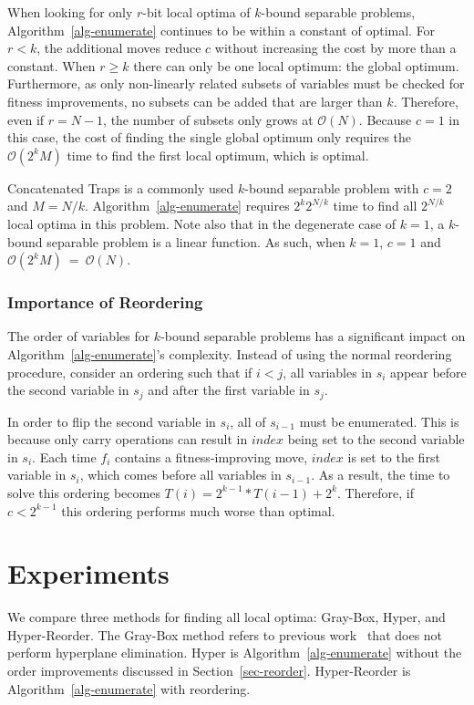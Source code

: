 \documentclass[runningheads,a4paper]{llncs}
\newcommand{\BigO}[1]{$\mathcal{O}{(#1)}$}
\begin{document}
When looking for only $r$-bit local optima of $k$-bound separable problems,
Algorithm~\ref{alg-enumerate} continues to be within a constant of optimal.
For $r < k$, the additional moves reduce $c$ without increasing the cost
by more than a constant.
When $r \geq k$ there can only be one local optimum: the global optimum. Furthermore, as
only non-linearly related subsets of variables must be checked
for fitness improvements, no subsets can be added that are larger than $k$.
Therefore, even if $r=N-1$, the number of subsets only grows at \BigO{N}.
Because $c=1$ in this case, the cost of finding the single global optimum
only requires the \BigO{2^kM} time to find the first local optimum, which is
optimal.

Concatenated Traps is a commonly used $k$-bound separable problem
with $c=2$ and $M=N/k$.  Algorithm~\ref{alg-enumerate} requires $2^k2^{N/k}$ time
to find all $2^{N/k}$ local optima in this problem. Note also that
in the degenerate case of $k=1$, a $k$-bound separable problem
is a linear function. As such, when $k=1$, $c=1$ and
\BigO{2^kM}~=~\BigO{N}.

\subsubsection{Importance of Reordering}
The order of variables for $k$-bound separable problems
has a significant impact on Algorithm~\ref{alg-enumerate}'s complexity.
Instead of using the normal reordering procedure, consider an ordering
such that if $i < j$, all variables in $s_i$ appear before the second variable
in $s_j$ and after the first variable in $s_j$.

In order to flip the second variable in $s_i$, all of $s_{i-1}$ must be enumerated.
This is because only carry operations can result in $index$ being set to the second
variable in $s_i$. Each time $f_i$ contains a fitness-improving move, $index$ is set
to the first variable in $s_i$, which comes before all variables in $s_{i-1}$.
As a result, the time to solve this ordering becomes $T(i) = 2^{k-1}*T(i-1)+2^k$.
Therefore, if $c < 2^{k-1}$ this ordering performs much worse than optimal.

\section{Experiments}
We compare three methods for finding all local optima: Gray-Box, Hyper, and Hyper-Reorder.
The Gray-Box method refers to previous work~\cite{ochoa:2015:crossovernetworks} that does
not perform hyperplane elimination. Hyper is Algorithm~\ref{alg-enumerate} without the order
improvements discussed in Section~\ref{sec-reorder}. Hyper-Reorder is Algorithm~\ref{alg-enumerate} with
reordering.
\end{document}
